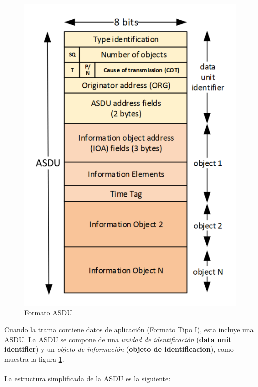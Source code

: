 \documentclass[a5paper]{book}%
\begin{document}
\begin{figure}[H]
	\centering
	\caption{Formato ASDU}
	\label{fig:formatoasdu}
	\includegraphics[width=0.7\linewidth]{formato_ASDU}
\end{figure}


Cuando la trama contiene datos de aplicación (Formato Tipo I), esta incluye una ASDU. La ASDU se compone de una \textit{unidad de identificación} (\textbf{data unit identifier}) y un \textit{objeto de información} (\textbf{objeto de identificacion}),  como muestra la figura \ref{fig:formatoasdu}.\\\\

La estructura simplificada de la ASDU es la siguiente:
\end{document}
